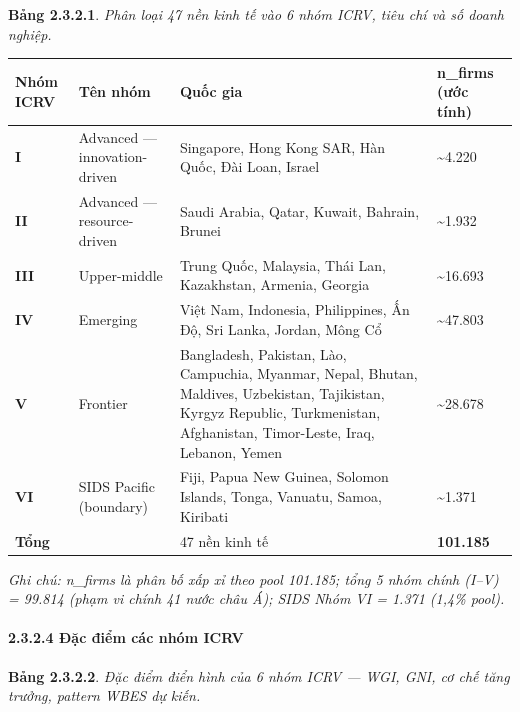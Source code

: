 \documentclass[12pt,a4paper]{article}
\begin{document}
\textbf{Bảng 2.3.2.1}. \emph{Phân loại 47 nền kinh tế vào 6 nhóm ICRV,
tiêu chí và số doanh nghiệp.}

\begin{longtable}[]{@{}llll@{}}
\toprule\noalign{}
Nhóm ICRV & Tên nhóm & Quốc gia & n\_firms (ước tính) \\
\midrule\noalign{}
\endhead
\bottomrule\noalign{}
\endlastfoot
\textbf{I} & Advanced --- innovation-driven & Singapore, Hong Kong SAR,
Hàn Quốc, Đài Loan, Israel & \textasciitilde4.220 \\
\textbf{II} & Advanced --- resource-driven & Saudi Arabia, Qatar,
Kuwait, Bahrain, Brunei & \textasciitilde1.932 \\
\textbf{III} & Upper-middle & Trung Quốc, Malaysia, Thái Lan,
Kazakhstan, Armenia, Georgia & \textasciitilde16.693 \\
\textbf{IV} & Emerging & Việt Nam, Indonesia, Philippines, Ấn Độ, Sri
Lanka, Jordan, Mông Cổ & \textasciitilde47.803 \\
\textbf{V} & Frontier & Bangladesh, Pakistan, Lào, Campuchia, Myanmar,
Nepal, Bhutan, Maldives, Uzbekistan, Tajikistan, Kyrgyz Republic,
Turkmenistan, Afghanistan, Timor-Leste, Iraq, Lebanon, Yemen &
\textasciitilde28.678 \\
\textbf{VI} & SIDS Pacific (boundary) & Fiji, Papua New Guinea, Solomon
Islands, Tonga, Vanuatu, Samoa, Kiribati & \textasciitilde1.371 \\
\textbf{Tổng} & & 47 nền kinh tế & \textbf{101.185} \\
\end{longtable}

\emph{Ghi chú: n\_firms là phân bố xấp xỉ theo pool 101.185; tổng 5 nhóm
chính (I--V) = 99.814 (phạm vi chính 41 nước châu Á); SIDS Nhóm VI =
1.371 (1,4\% pool).}

\hypertarget{2324-ux111ux1eb7c-ux111iux1ec3m-cuxe1c-nhuxf3m-icrv}{%
\paragraph{2.3.2.4 Đặc điểm các nhóm
ICRV}\label{2324-ux111ux1eb7c-ux111iux1ec3m-cuxe1c-nhuxf3m-icrv}}

\textbf{Bảng 2.3.2.2}. \emph{Đặc điểm điển hình của 6 nhóm ICRV --- WGI,
GNI, cơ chế tăng trưởng, pattern WBES dự kiến.}
\end{document}
